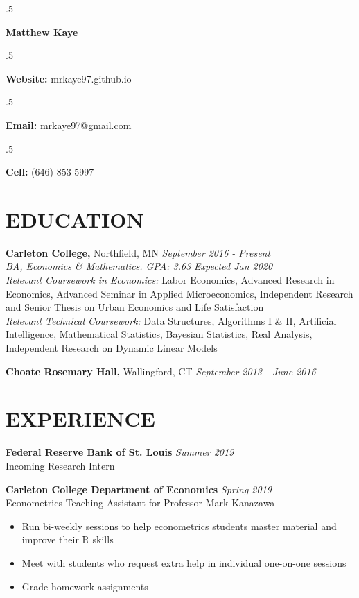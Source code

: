 \documentclass[margin, 9pt]{res} %
\begin{document}
\singlespacing

\moveleft.5\hoffset\centerline{\LARGE\bf Matthew Kaye} %
\medskip
\moveleft.5\hoffset\centerline{\textbf{Website:} mrkaye97.github.io}
\moveleft.5\hoffset\centerline{\textbf{Email:} mrkaye97@gmail.com}
\moveleft.5\hoffset\centerline{\textbf{Cell:} (646) 853-5997}


\begin{resume}


\section{EDUCATION}

{\sl} \textbf{Carleton College,} Northfield, MN \hfill \textit{September 2016 - Present}\smallskip\\
{\sl BA, Economics \& Mathematics. GPA: 3.63} \hfill \textit{Expected Jan 2020}\smallskip\\
{\sl Relevant Coursework in Economics: } Labor Economics, Advanced Research in Economics, Advanced Seminar in Applied Microeconomics, Independent Research and Senior Thesis on Urban Economics and Life Satisfaction\smallskip\\
{\sl Relevant Technical Coursework: } Data Structures, Algorithms I \& II, Artificial Intelligence, Mathematical Statistics, Bayesian Statistics, Real Analysis, Independent Research on Dynamic Linear Models

{\sl} \textbf{Choate Rosemary Hall,} Wallingford, CT \hfill \textit{September 2013 - June 2016}

\section{EXPERIENCE}
{\sl} \textbf{Federal Reserve Bank of St. Louis} \hfill \textit{Summer 2019}\smallskip\\
{\sl} Incoming Research Intern \smallskip

{\sl} \textbf{Carleton College Department of Economics} \hfill \textit{Spring 2019}\\
{\sl} Econometrics Teaching Assistant for Professor Mark Kanazawa\smallskip
{\sl} \begin{itemize}
	\item Run bi-weekly sessions to help econometrics students master material and improve their R skills
	\item Meet with students who request extra help in individual one-on-one sessions
	\item Grade homework assignments
\end{itemize}



\end{resume}
\end{document}
